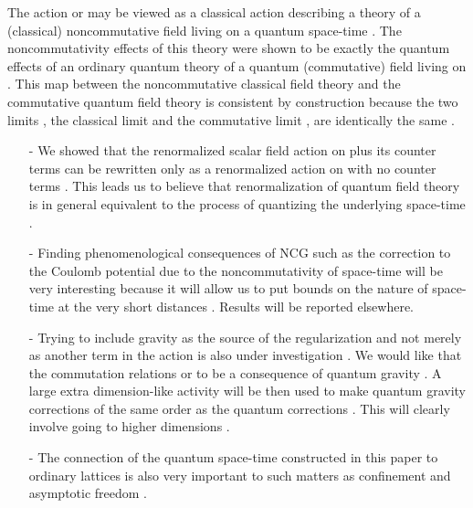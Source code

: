 \documentclass[a4paper,12pt]{article}
\let\oldtheequation=\theequation
\def\doteqs#1{\setcounter{equation}{0}
            \def\theequation{{#1}.\oldtheequation}}
\newcounter{sxn}
\def\sx#1{\addtocounter{sxn}{1}
\medskip \goodbreak
\noindent{\large\bf
\centerline{\thesxn.~~#1}} \nobreak \medskip}
\def\sxn#1{\sx{#1} \doteqs{\thesxn}}
\begin{document}
The action \coordHE{} or \coordHE{} may be viewed as a classical action describing a \coordHE{} theory of a (classical) noncommutative field \myHighlight{${\hat{\phi}}$}\coordHE{} living on a quantum space-time \coordHE{} . The noncommutativity effects of this theory were shown to be exactly the quantum effects of an ordinary quantum \coordHE{} theory of a quantum (commutative) field \myHighlight{${\hat{\phi}}$}\coordHE{} living on \coordHE{} . This map between the noncommutative classical field theory and the commutative quantum field theory is consistent by construction because the two limits , the classical limit \coordHE{} and the commutative limit \coordHE{} , are identically the same . 



\sxn{Conclusion}
\begin{itemize}

\item[-]We showed that the renormalized scalar field action on \coordHE{}
plus its counter terms can be rewritten only as a renormalized
action on \coordHE{} with no counter terms . This leads us to believe
that renormalization of quantum field theory is in general
equivalent to the process of quantizing the underlying space-time
.


\item[-]Finding phenomenological consequences of NCG such as the
correction to the Coulomb potential due to the noncommutativity of
space-time will be very interesting because it will allow us to
put  bounds on the nature of space-time at the very short
distances . Results will be reported elsewhere.

\item[-] Trying to include gravity as the source of the
regularization and not merely as another term in the action is
also under investigation . We would like that the commutation
relations \coordHE{} or \coordHE{} to be a consequence of quantum
gravity . A large extra dimension-like activity will be then used
to make quantum gravity corrections of the same order as the
quantum corrections . This will clearly involve going to higher
dimensions .

\item[-]The connection of the quantum space-time constructed in
this paper to ordinary lattices is also very important to such
matters as confinement and asymptotic freedom .
\end{itemize}
\end{document}
